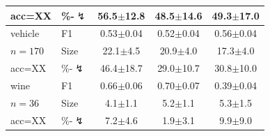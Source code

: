 \begin{tabular}{llccc}
acc=XX & \%-$\lightning$ & 56.5{\scriptsize$\pm$12.8} & 48.5{\scriptsize$\pm$14.6} & 49.3{\scriptsize$\pm$17.0} \\
\midrule
vehicle & F1 & 0.53{\scriptsize$\pm$0.04} & 0.52{\scriptsize$\pm$0.04} & 0.56{\scriptsize$\pm$0.04} \\
$n=170$ & Size & 22.1{\scriptsize$\pm$4.5} & 20.9{\scriptsize$\pm$4.0} & 17.3{\scriptsize$\pm$4.0} \\
acc=XX & \%-$\lightning$ & 46.4{\scriptsize$\pm$18.7} & 29.0{\scriptsize$\pm$10.7} & 30.8{\scriptsize$\pm$10.0} \\
\midrule
wine & F1 & 0.66{\scriptsize$\pm$0.06} & 0.70{\scriptsize$\pm$0.07} & 0.39{\scriptsize$\pm$0.04} \\
$n=36$ & Size & 4.1{\scriptsize$\pm$1.1} & 5.2{\scriptsize$\pm$1.1} & 5.3{\scriptsize$\pm$1.5} \\
acc=XX & \%-$\lightning$ & 7.2{\scriptsize$\pm$4.6} & 1.9{\scriptsize$\pm$3.1} & 9.9{\scriptsize$\pm$9.0} \\
\bottomrule
\end{tabular}